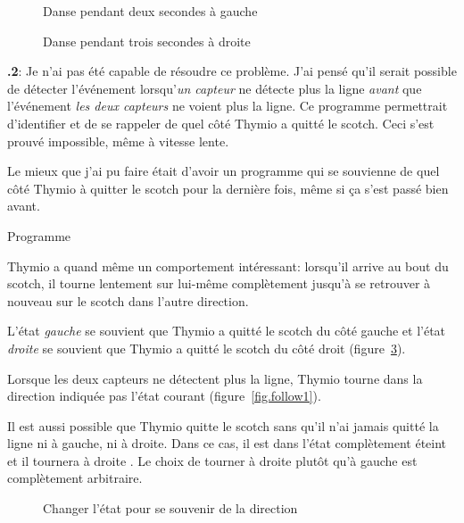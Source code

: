 \documentclass[12pt,a4paper,english]{article}
\begin{document}
\begin{figure}
\begin{center}
\caption{Danse pendant deux secondes à gauche}\label{fig.dance-left}
\end{center}
\end{figure}

\begin{figure}
\begin{center}
\caption{Danse pendant trois secondes à droite}\label{fig.dance-right}
\end{center}
\end{figure}

\textbf{\thesection.2}:
Je n'ai pas été capable de résoudre ce problème. J'ai pensé qu'il serait possible de détecter l'événement lorsqu'\emph{un capteur} ne détecte plus la ligne \emph{avant} que l'événement \emph{les deux capteurs} ne voient plus la ligne. Ce programme permettrait d'identifier et de se rappeler de quel côté Thymio a quitté le scotch. Ceci s'est prouvé impossible, même à vitesse lente.

Le mieux que j'ai pu faire était d'avoir un programme qui se souvienne de quel côté Thymio à quitter le scotch pour la dernière fois, même si ça s'est passé bien avant.

{\raggedleft \hfill Programme }

Thymio a quand même un comportement intéressant: lorsqu'il arrive au bout du scotch, il tourne lentement sur lui-même complètement jusqu'à se retrouver à nouveau sur le scotch dans l'autre direction.

L'état \emph{gauche}  se souvient que Thymio a quitté le scotch du côté gauche et l'état \emph{droite}  se souvient que Thymio a quitté le scotch du côté droit (figure~\ref{fig.follow3}).

Lorsque les deux capteurs ne détectent plus la ligne, Thymio tourne dans la direction indiquée pas l'état courant (figure~\ref{fig.follow1}). 

Il est aussi possible que Thymio quitte le scotch sans qu'il n'ai jamais quitté la ligne ni à gauche, ni à droite. Dans ce cas, il est dans l'état complètement éteint et il tournera à droite . Le choix de tourner à droite plutôt qu'à gauche est complètement arbitraire.

\begin{figure}
\begin{center}
\caption{Changer l'état pour se souvenir de la direction}\label{fig.follow3}
\end{center}
\end{figure}
\end{document}
